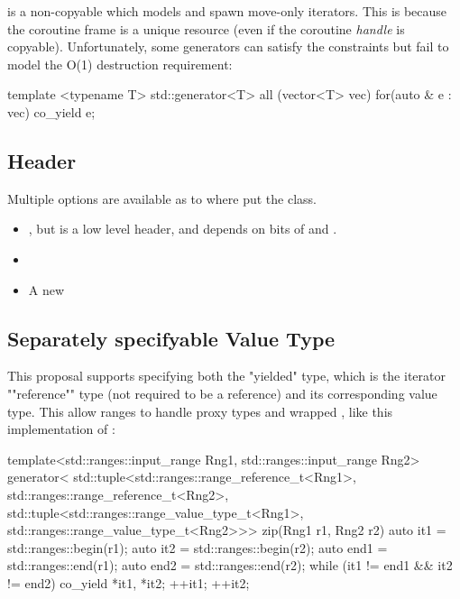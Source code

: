 \documentclass{wg21}
\begin{document}
 is a non-copyable  which models  and spawn move-only iterators.
This is because the coroutine frame is a unique resource (even if the coroutine \textit{handle} is copyable).
Unfortunately, some generators can satisfy the  constraints but fail to model the  O(1) 
destruction requirement:

\begin{colorblock}

template <typename T>
std::generator<T> all (vector<T> vec) {
    for(auto & e : vec)  {
        co_yield e;
    }
}

\end{colorblock}



\subsection{Header}

Multiple options are available as to where put the  class.

\begin{itemize}
\item {}, but  is a low level header, and  depends on bits of  and .

\item {}

\item A new 

\end{itemize}

\subsection{Separately specifyable Value Type}

This proposal supports specifying both the "yielded" type, which is the iterator ""reference"" type (not required to be a reference) and its corresponding value type.
This allow ranges to handle proxy types and wrapped , like this implementation of :

\begin{colorblock}
template<std::ranges::input_range Rng1,
         std::ranges::input_range Rng2>
generator<
    std::tuple<std::ranges::range_reference_t<Rng1>,
               std::ranges::range_reference_t<Rng2>,
    std::tuple<std::ranges::range_value_type_t<Rng1>,
               std::ranges::range_value_type_t<Rng2>>>
zip(Rng1 r1, Rng2 r2) {
    auto it1 = std::ranges::begin(r1);
    auto it2 = std::ranges::begin(r2);
    auto end1 = std::ranges::end(r1);
    auto end2 = std::ranges::end(r2);
    while (it1 != end1 && it2 != end2) {
        co_yield {*it1, *it2};
        ++it1; ++it2;
    }
}
\end{colorblock}
\end{document}
